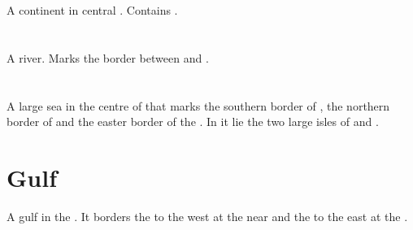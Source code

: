 \section{\PelidorContinent}
\index{\PelidorContinent}
A continent in central . Contains . 
















\section[Pylor]{\Pylor}
\index{\Pylor}
A river. 
Marks the border between  and .















\section{\Risvaelsea}
\index{\Risvaelsea}
A large sea in the centre of  that marks the southern border of , the northern border of  and the easter border of the . In it lie the two large isles of  and . 















\section{\Samure{} Gulf}
A gulf in the . It borders the  to the west at the  near  and the  to the east at the . 















